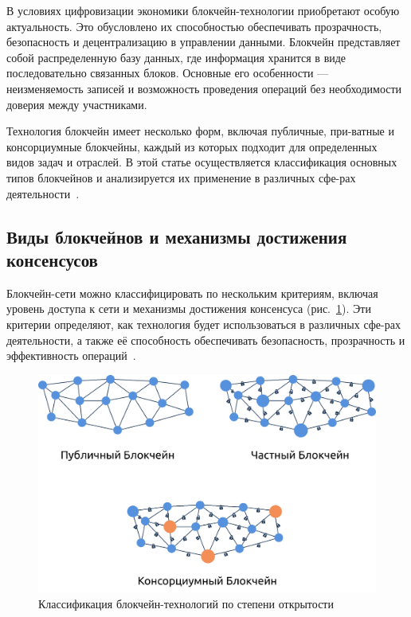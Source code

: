\documentclass{mirea-article}
\begin{document}
В условиях цифровизации экономики блокчейн-технологии приобретают особую актуальность. Это обусловлено их способностью обеспечивать прозрачность, безопасность и децентрализацию в управлении данными. Блокчейн представляет собой распределенную базу данных, где информация хранится в виде последовательно связанных блоков. Основные его особенности --- неизменяемость записей и возможность проведения операций без необходимости доверия между участниками.

Технология блокчейн имеет несколько форм, включая публичные, при-ватные и консорциумные блокчейны, каждый из которых подходит для определенных видов задач и отраслей. В этой статье осуществляется классификация основных типов блокчейнов и анализируется их применение в различных сфе-рах деятельности~\cite[с. 54 --- 61]{bib:blckgn}.

\subsection*{Виды блокчейнов и механизмы достижения консенсусов}

Блокчейн-сети можно классифицировать по нескольким критериям, включая уровень доступа к сети и механизмы достижения консенсуса (рис.~\ref{fig:types_of_blockchains}). Эти критерии определяют, как технология будет использоваться в различных сфе-рах деятельности, а также её способность обеспечивать безопасность, прозрачность и эффективность операций~\cite[с. 37 --- 75]{bib:blcktech}.


\begin{figure}[H]   
	\centering
	\includegraphics[width=\textwidth]{../images/types_of_blockchains.png}
	\parskip=6pt
	\caption{Классификация блокчейн-технологий по степени открытости}
	\label{fig:types_of_blockchains}
\end{figure}
\end{document}
